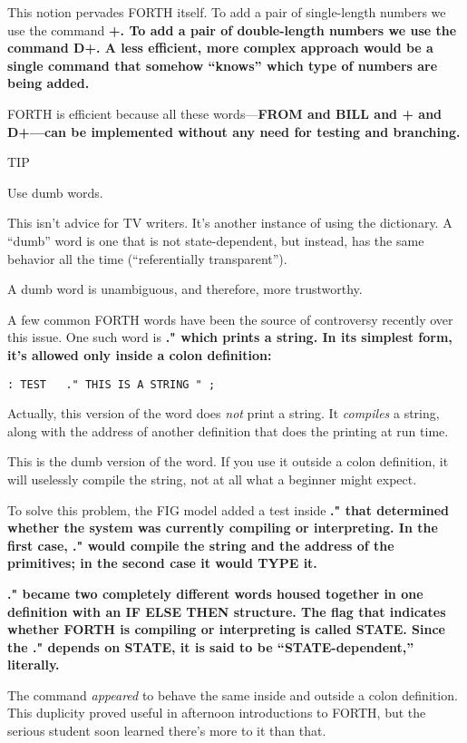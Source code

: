 This notion pervades FORTH itself. To add a pair of single-length
numbers we use the command \bf{+}. To add a pair of double-length numbers
we use the command \bf{D+}. A less efficient, more complex approach would
be a single command that somehow ``knows'' which type of numbers are
being added.

FORTH is efficient because all these words---\bf{FROM} and \bf{BILL} and
\bf{+} and \bf{D+}---can be implemented without any need for testing and
branching.

TIP

Use dumb words.

This isn't advice for TV writers. It's another instance of using the
dictionary. A ``dumb'' word is one that is not state-dependent, but
instead, has the same behavior all the time (``referentially transparent'').

A dumb word is unambiguous, and therefore, more trustworthy.

A few common FORTH words have been the source of controversy
recently over this issue. One such word is \bf{."} which prints a string.
In its simplest form, it's allowed only inside a colon definition:

\begin{verbatim}
: TEST   ." THIS IS A STRING " ;
\end{verbatim}

Actually, this version of the word does \emph{not} print a string. It
\emph{compiles} a string, along with the address of another definition
that does the printing at run time.

This is the dumb version of the word. If you use it outside a colon
definition, it will uselessly compile the string, not at all what a beginner
might expect.

To solve this problem, the FIG model added a test inside \bf{."} that
determined whether the system was currently compiling or interpreting.
In the first case, \bf{."} would compile the string and the address of the
primitives; in the second case it would \bf{TYPE} it.

\bf{."} became two completely different words housed together in one
definition with an \bf{IF ELSE THEN} structure. The flag that indicates
whether FORTH is compiling or interpreting is called \bf{STATE}. Since the
\bf{."} depends on \bf{STATE}, it is said to be ``\bf{STATE}-dependent,''
literally.

The command \emph{appeared} to behave the same inside and outside a
colon definition. This duplicity proved useful in afternoon introductions
to FORTH, but the serious student soon learned there's more to it than
that.

